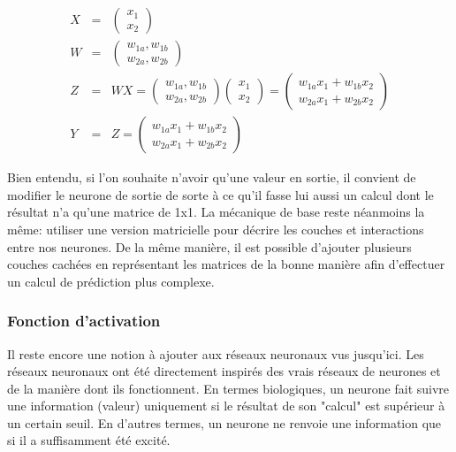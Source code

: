 \documentclass[11pt,a4paper]{report}
\begin{document}
    \begin{eqnarray}
    X &=& \begin{pmatrix} x_1 \\ x_2 \end{pmatrix} \\
    W &=& \begin{pmatrix} w_{1a} , w_{1b} \\ w_{2a}, w_{2b} \end{pmatrix} \\
    Z &=& WX  = \begin{pmatrix} w_{1a} , w_{1b} \\ w_{2a}, w_{2b} \end{pmatrix}\begin{pmatrix} x_1 \\ x_2 \end{pmatrix} = \begin{pmatrix} w_{1a}x_1 + w_{1b}x_2 \\ w_{2a}x_1+w_{2b}x_2 \end{pmatrix} \\
    Y &=& Z = \begin{pmatrix} w_{1a}x_1 + w_{1b}x_2 \\ w_{2a}x_1+w_{2b}x_2 \end{pmatrix}
    \end{eqnarray}
    
    \par Bien entendu, si l'on souhaite n'avoir qu'une valeur en sortie, il convient de modifier le neurone de sortie de sorte à ce qu'il fasse lui aussi un calcul dont le résultat n'a qu'une matrice de 1x1. La mécanique de base reste néanmoins la même: utiliser une version matricielle pour décrire les couches et interactions entre nos neurones. De la même manière, il est possible d'ajouter plusieurs couches cachées en représentant les matrices de la bonne manière afin d'effectuer un calcul de prédiction plus complexe. 
    

  \subsubsection{Fonction d'activation}    
  
    \par Il reste encore une notion à ajouter aux réseaux neuronaux vus jusqu'ici. Les réseaux neuronaux ont été directement inspirés des vrais réseaux de neurones et de la manière dont ils fonctionnent. En termes biologiques, un neurone fait suivre une information (valeur) uniquement si le résultat de son "calcul" est supérieur à un certain seuil. En d'autres termes, un neurone ne renvoie une information que si il a suffisamment été excité. 
    
\end{document}
